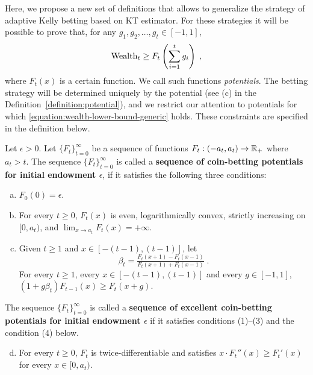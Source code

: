 Here, we propose a new set of definitions that allows to generalize the
strategy of adaptive Kelly betting based on KT estimator. For these strategies
it will be possible to prove that, for any $g_1, g_2, \dots, g_t \in [-1,1]$,
\begin{equation}
\label{equation:wealth-lower-bound-generic}
\operatorname{Wealth}_t \ge F_t \left( \sum_{i=1}^t g_i \right) \; ,
\end{equation}
where $F_t(x)$ is a certain function. We call such functions \emph{potentials}.
The betting strategy will be determined uniquely by the potential (see (c) in
the Definition~\ref{definition:potential}), and we restrict our attention to
potentials for which \eqref{equation:wealth-lower-bound-generic} holds. These
constraints are specified in the definition below.
\begin{definition}
\label{definition:potential}
Let $\epsilon > 0$. Let $\{F_t\}_{t=0}^\infty$ be a sequence of functions
$F_t:(-a_t, a_t)  \to \mathbb{R}_+$ where $a_t > t$.  The sequence
$\{F_t\}_{t=0}^\infty$ is called a \textbf{sequence of coin-betting potentials
for initial endowment $\epsilon$}, if it satisfies the following three
conditions:
\begin{enumerate}[(a)]
\item $F_0(0) = \epsilon$.

\item For every $t \ge 0$, $F_t(x)$ is even, logarithmically convex, strictly
increasing on $[0,a_t)$, and
$\lim_{x \to a_t} F_t(x) = +\infty$.
\item Given $t \ge 1$ and $x \in [-(t-1), (t-1)]$, let
\begin{equation}
\label{equation:potential-based-strategy}
\beta_t=\tfrac{F_t(x + 1) - F_t(x - 1)}{F_t(x + 1) + F_t(x - 1)} \;.
\end{equation}
For every $t \ge 1$, every $x \in [-(t-1), (t-1)]$ and every $g \in [-1,1]$, $\left(1 + g \beta_t \right) F_{t-1}(x) \ge F_t(x+g)$.
\end{enumerate}
The sequence $\{F_t\}_{t=0}^\infty$ is called a
\textbf{sequence of excellent coin-betting potentials for initial
endowment $\epsilon$} if it satisfies conditions (1)--(3) and the condition (4)
below.
\begin{enumerate}[(a)]
\setcounter{enumi}{3}
\item For every $t \ge 0$, $F_t$ is twice-differentiable and
satisfies $x \cdot F_t''(x) \ge F_t'(x)$ for every $x \in [0,a_t)$.
\end{enumerate}
\end{definition}

